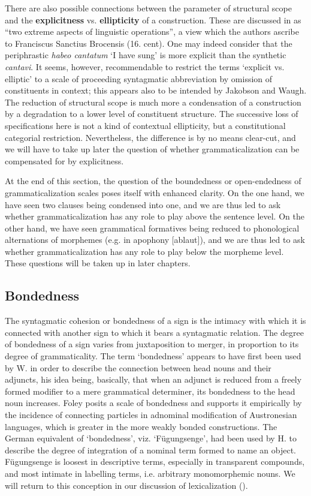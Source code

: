 There are also possible connections between the parameter of structural scope and the \textbf{explicitness} vs. \textbf{ellipticity} of a construction. These are discussed in \citet[6f]{JakobsonEtAl1979} as “two extreme aspects of linguistic operations”, a view which the authors ascribe to Franciscus Sanctius Brocensis (16. cent). One may indeed consider that the periphrastic \textit{habeo cantatum} ‘I have sung’ is more explicit than the synthetic \textit{cantavi}. It seems, however, recommendable to restrict the terms ‘explicit vs. elliptic’ to a scale of proceeding syntagmatic abbreviation by omission of constituents in context; this appears also to be intended by Jakobson and Waugh. The reduction of structural scope is much more a condensation of a construction by a degradation to a lower level of constituent structure. The successive loss of specifications here is not a kind of contextual ellipticity, but a constitutional categorial restriction. Nevertheless, the difference is by no means clear-cut, and we will have to take up later the question of whether grammaticalization can be compensated for by explicitness.

At the end of this section, the question of the boundedness or open-endedness of grammaticalization scales poses itself with enhanced clarity. On the one hand, we have seen two clauses being condensed into one, and we are thus led to ask whether grammaticalization has any role to play above the sentence level. On the other hand, we have seen grammatical formatives being reduced to phonological alternations of morphemes (e.g. in apophony [ablaut]), and we are thus led to ask whether grammaticalization has any role to play below the morpheme level. These questions will be taken up in later chapters.

\subsection{Bondedness}\label{sec:4.3.2}

The syntagmatic cohesion or bondedness of a sign is the intimacy with which it is connected with another sign to which it bears a syntagmatic relation. The degree of bondedness of a sign varies from juxtaposition to merger, in proportion to its degree of grammaticality. The term ‘bondedness’ appears to have first been used by W. \citet{Foley1980} in order to describe the connection between head nouns and their adjuncts, his idea being, basically, that when an adjunct is reduced from a freely formed modifier to a mere grammatical determiner, its bondedness to the head noun increases. Foley posits a scale of bondedness and supports it empirically by the incidence of connecting particles in adnominal modification of Austronesian languages, which is greater in the more weakly bonded constructions. The German equivalent of ‘bondedness’, viz. ‘Fügungsenge’, had been used by H. \citet{Seiler1975} to describe the degree of integration of a nominal term formed to name an object. Fügungsenge is loosest in descriptive terms, especially in transparent compounds, and most intimate in labelling terms, i.e. arbitrary monomorphemic nouns. We will return to this conception in our discussion of lexicalization ().


